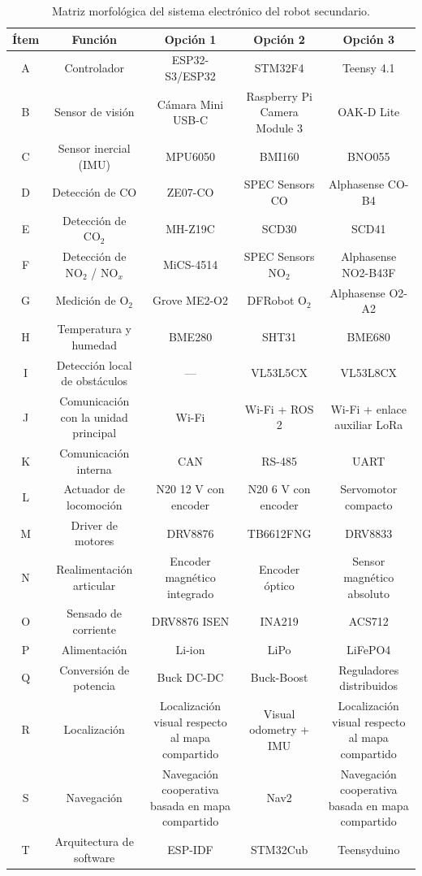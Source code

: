 \begin{table}[htbp]
\centering
\small
\renewcommand{\arraystretch}{1.3} %
\setlength{\tabcolsep}{4pt}       %

\begin{tabularx}{\textwidth}{|c|C|C|C|C|}
\hline
\textbf{Ítem} & \textbf{Función} & \textbf{Opción 1} & \textbf{Opción 2} & \textbf{Opción 3} \\
\hline
A & Controlador & ESP32-S3/ESP32 & STM32F4 & Teensy 4.1 \\
\hline
B & Sensor de visión & Cámara Mini USB-C & Raspberry Pi Camera Module 3 & OAK-D Lite \\
\hline
C & Sensor inercial (IMU) & MPU6050 & BMI160 & BNO055 \\
\hline
D & Detección de CO & ZE07-CO & SPEC Sensors CO & Alphasense CO-B4 \\
\hline
E & Detección de $\text{CO}_2$ & MH-Z19C & SCD30 & SCD41 \\
\hline
F & Detección de $\text{NO}_2$ / $\text{NO}_x$ & MiCS-4514 & SPEC Sensors $\text{NO}_2$ & Alphasense NO2-B43F \\
\hline
G & Medición de $\text{O}_2$ & Grove ME2-O2 & DFRobot $\text{O}_2$ & Alphasense O2-A2 \\
\hline
H & Temperatura y humedad & BME280 & SHT31 & BME680 \\
\hline
I & Detección local de obstáculos & --- & VL53L5CX & VL53L8CX \\
\hline
J & Comunicación con la unidad principal & Wi-Fi & Wi-Fi + ROS 2 & Wi-Fi + enlace auxiliar LoRa \\
\hline
K & Comunicación interna & CAN & RS-485 & UART \\
\hline
L & Actuador de locomoción & N20 12 V con encoder & N20 6 V con encoder & Servomotor compacto \\
\hline
M & Driver de motores & DRV8876 & TB6612FNG & DRV8833 \\
\hline
N & Realimentación articular & Encoder magnético integrado & Encoder óptico & Sensor magnético absoluto \\
\hline
O & Sensado de corriente & DRV8876 ISEN & INA219 & ACS712 \\
\hline
P & Alimentación & Li-ion & LiPo & LiFePO4 \\
\hline
Q & Conversión de potencia & Buck DC-DC & Buck-Boost & Reguladores distribuidos \\
\hline
R & Localización & Localización visual respecto al mapa compartido & Visual odometry + IMU & Localización visual respecto al mapa compartido \\
\hline
S & Navegación & Navegación cooperativa basada en mapa compartido & Nav2 & Navegación cooperativa basada en mapa compartido \\
\hline
T & Arquitectura de software & ESP-IDF & STM32Cub & Teensyduino \\
\hline
\end{tabularx}
\caption{Matriz morfológica del sistema electrónico del robot secundario.}
\label{tab:matriz_morfologica_secundario}
\end{table}


